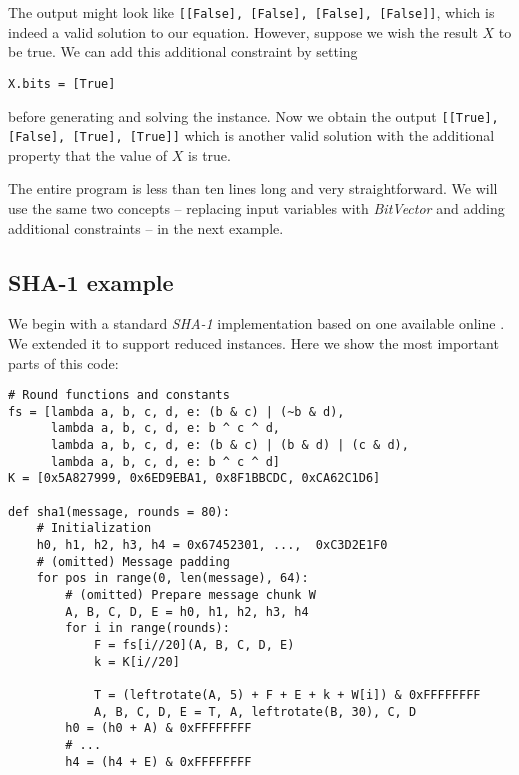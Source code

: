 The output might look like \texttt{[[False], [False], [False], [False]]}, which is indeed a valid solution to our equation.
However, suppose we wish the result $X$ to be true.
We can add this additional constraint by setting

\begin{verbatim}
X.bits = [True]
\end{verbatim}

\noindent before generating and solving the instance.
Now we obtain the output \texttt{[[True], [False], [True], [True]]} which is another valid solution with the additional property that the value of $X$ is true.

The entire program is less than ten lines long and very straightforward.
We will use the same two concepts -- replacing input variables with \emph{BitVector} and adding additional constraints -- in the next example.

\subsection{SHA-1 example}
We begin with a standard \emph{SHA-1} implementation based on one available online \cite{alt2013sha1}.
We extended it to support reduced instances.
Here we show the most important parts of this code:

\begin{verbatim}
# Round functions and constants
fs = [lambda a, b, c, d, e: (b & c) | (~b & d),
      lambda a, b, c, d, e: b ^ c ^ d,
      lambda a, b, c, d, e: (b & c) | (b & d) | (c & d),
      lambda a, b, c, d, e: b ^ c ^ d]
K = [0x5A827999, 0x6ED9EBA1, 0x8F1BBCDC, 0xCA62C1D6]

def sha1(message, rounds = 80):
    # Initialization
    h0, h1, h2, h3, h4 = 0x67452301, ...,  0xC3D2E1F0
    # (omitted) Message padding
    for pos in range(0, len(message), 64):
        # (omitted) Prepare message chunk W
        A, B, C, D, E = h0, h1, h2, h3, h4
        for i in range(rounds):
            F = fs[i//20](A, B, C, D, E)
            k = K[i//20]

            T = (leftrotate(A, 5) + F + E + k + W[i]) & 0xFFFFFFFF
            A, B, C, D, E = T, A, leftrotate(B, 30), C, D
        h0 = (h0 + A) & 0xFFFFFFFF
        # ...        
        h4 = (h4 + E) & 0xFFFFFFFF
\end{verbatim}

